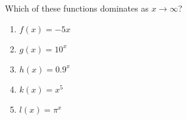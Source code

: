 \bigskip

\item Which of these functions dominates as $x \rightarrow \infty$?

\begin{enumerate}
\item $f(x) = - 5x$
\item $g(x) = 10^x$
\item $h(x) = 0.9^x$
\item $k(x) = x^5$
\item $l(x) = \pi^x$
\end{enumerate}

